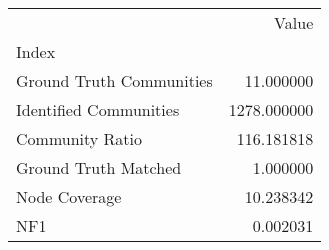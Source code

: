 \begin{tabular}{lr}
\toprule
{} &        Value \\
Index                    &              \\
\midrule
Ground Truth Communities &    11.000000 \\
Identified Communities   &  1278.000000 \\
Community Ratio          &   116.181818 \\
Ground Truth Matched     &     1.000000 \\
Node Coverage            &    10.238342 \\
NF1                      &     0.002031 \\
\bottomrule
\end{tabular}

